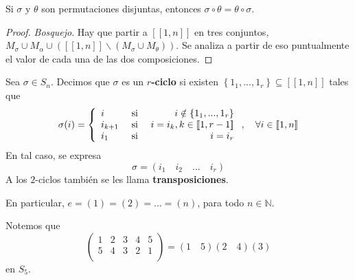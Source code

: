 \documentclass[12pt]{report}
\theoremstyle{largebreak}
\newcommand\natint[1]{\ensuremath{\left[\!\left[ #1\right]\!\right]}}
\begin{document}
    \begin{propo}
        Si $\sigma$ y $\theta$ son permutaciones disjuntas, entonces $\sigma\circ\theta=\theta\circ\sigma$.
    \end{propo}

    \begin{proof}
        \textit{Bosquejo}. Hay que partir a $\natint{1,n}$ en tres conjuntos, $M_\sigma\cup M_\alpha\cup(\natint{1,n}\backslash(M_\sigma\cup M_\theta))$. Se analiza a partir de eso puntualmente el valor de cada una de las dos composiciones.
    \end{proof}

    \begin{mydef}
        Sea $\sigma\in S_n$. Decimos que $\sigma$ es un \textbf{$r$-ciclo} si existen $\left\{1_1,...,1_r\right\}\subseteq\natint{1,n}$ tales que
        \begin{equation*}
            \sigma(i)=\left\{
                \begin{array}{lcr}
                    i & \textup{ si } & i\notin\left\{1_1,...,1_r\right\}\\
                    i_{ k+1} & \textup{ si } & i=i_k, k\in\natint{1,r-1}\\
                    i_1 & \textup{ si } & i=i_{ r}\\
                \end{array}
            \right.,\quad\forall i\in\natint{1,n}
        \end{equation*}
        En tal caso, se expresa
        \begin{equation*}
            \sigma=\left(i_1\quad i_2\quad...\quad i_r \right)
        \end{equation*}
        A los $2$-ciclos también se les llama \textbf{transposiciones}.
    \end{mydef}

    \begin{obs}
        En particular, $e=(1)=(2)=...=(n)$, para todo $n\in\mathbb{N}$.
    \end{obs}

    \begin{exa}
        Notemos que
        \begin{equation*}
            \left(
                \begin{array}{ccccc}
                    1 & 2 & 3 & 4 & 5\\
                    5 & 4 & 3 & 2 & 1\\
                \end{array}
            \right)=(1\quad 5)(2\quad 4)(3)
        \end{equation*}
        en $S_5$.
    \end{exa}
\end{document}
